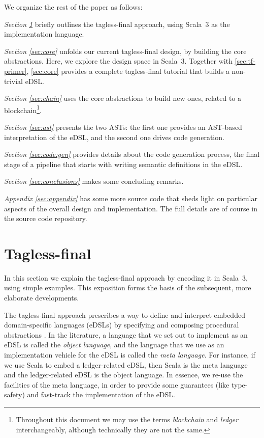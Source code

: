 \documentclass[11pt]{article}
\begin{document}
We organize the rest of the paper as follows:

\textit{Section \ref{sec:tf-primer}} briefly outlines the tagless-final approach, using Scala~3 as the implementation language.

\textit{Section \ref{sec:core}} unfolds our current tagless-final design, by building the core abstractions. Here, we explore the design space in Scala~3. Together with \autoref{sec:tf-primer}, \autoref{sec:core} provides a complete tagless-final tutorial that builds a non-trivial eDSL.

\textit{Section \ref{sec:chain}} uses the core abstractions to build new ones, related to a blockchain\footnote{Throughout this document we may use the terms \textit{blockchain} and \textit{ledger} interchangeably, although technically they are not the same.}.

\textit{Section \ref{sec:ast}} presents the two ASTs: the first one provides an AST-based interpretation of the eDSL, and the second one drives code generation. 

\textit{Section \ref{sec:code:gen}} provides details about the code generation process, the final stage of a pipeline that starts with writing semantic definitions in the eDSL.

\textit{Section \ref{sec:conclusions} } makes some concluding remarks.

\textit{Appendix \ref{sec:appendix}} has some more source code that sheds light on particular aspects of the overall design and implementation. The full details are of course in the source code repository.

\section{Tagless-final}
\label{sec:tf-primer}
\begin{tcolorbox}
\faAngleDoubleRight{ } In this section we explain the tagless-final approach by encoding it in Scala~3, using simple examples. This exposition forms the basis of the subsequent, more elaborate developments.
\end{tcolorbox}

The tagless-final approach \cite{tf:main:2009,tf:lecture:2012} prescribes a way to define and interpret embedded domain-specific languages (eDSLs) by specifying and composing procedural abstractions \cite{data:abstraction:1978}. In the literature, a language that we set out to implement as an eDSL is called the \textit{object language}, and the language that we use as an implementation vehicle for the eDSL is called the \textit{meta language}. For instance, if we use Scala to embed a ledger-related eDSL, then Scala is the meta language and the ledger-related eDSL is the object language. In essence, we re-use the facilities of the meta language, in order to provide some guarantees (like type-safety) and fast-track the implementation of the eDSL.
\end{document}
